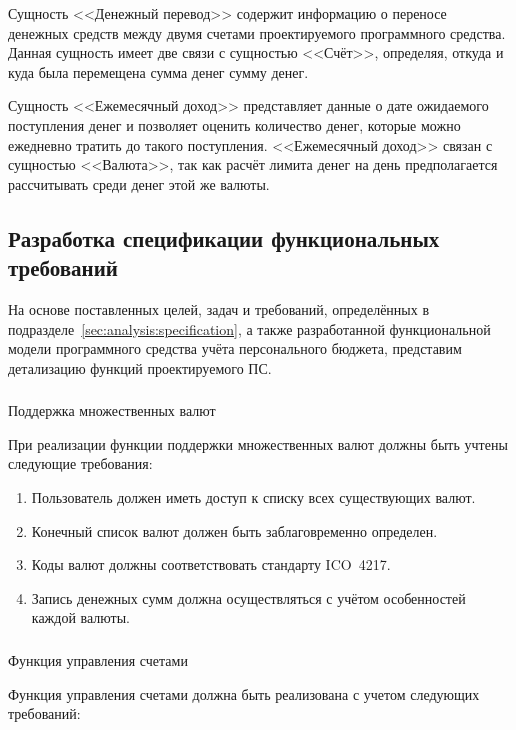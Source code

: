 Сущность <<Денежный перевод>> содержит информацию о переносе денежных средств между двумя счетами проектируемого программного средства.
Данная сущность имеет две связи с сущностью <<Счёт>>, определяя, откуда и куда была перемещена сумма денег сумму денег.

Сущность <<Ежемесячный доход>> представляет данные о дате ожидаемого поступления денег и позволяет оценить количество денег, которые можно ежедневно тратить до такого поступления.
<<Ежемесячный доход>> связан с сущностью <<Валюта>>, так как расчёт лимита денег на день предполагается рассчитывать среди денег этой же валюты.

\subsection{Разработка спецификации функциональных требований}
\label{sec:domain:specification}

На основе поставленных целей, задач и требований, определённых в подразделе~\ref{sec:analysis:specification}, а также разработанной функциональной модели программного средства учёта персонального бюджета, представим детализацию функций проектируемого ПС.

\subsubsection{} Поддержка множественных валют
\label{sec:domain:specification:currencies}

При реализации функции поддержки множественных валют должны быть учтены следующие требования:

\begin{enumerate}
    \item Пользователь должен иметь доступ к списку всех существующих валют.
    \item Конечный список валют должен быть заблаговременно определен.
    \item Коды валют должны соответствовать стандарту ICO~4217.
    \item Запись денежных сумм должна осуществляться с учётом особенностей каждой валюты.
\end{enumerate}


\subsubsection{} Функция управления счетами
\label{sec:domain:specification:wallets}

Функция управления счетами должна быть реализована с учетом следующих требований:

